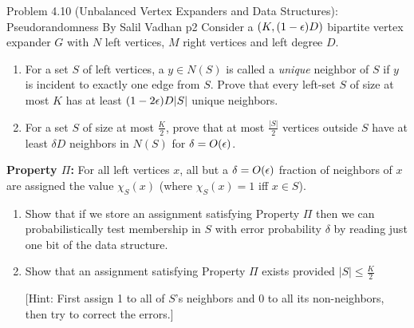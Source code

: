 \documentclass[a4paper, 11pt]{article}
\begin{document}
\begin{problem}{%
		Problem 4.10 (Unbalanced Vertex Expanders and Data Structures): Pseudorandomness By Salil Vadhan
	}{p2%
	}
	Consider a $(K,(1-\epsilon)D)$ bipartite vertex expander $G$ with $N$ left vertices, $M$ right vertices and left degree $D$.
	\begin{enumerate}
		\item For a set $S$ of left vertices, a $y\in N(S)$ is called a \textit{unique} neighbor of $S$ if $y$ is incident to exactly one edge from $S$. Prove that every left-set $S$ of size at most $K$ has at least $(1-2\epsilon)D|S|$ unique neighbors.
		\item For a set $S$ of size at most $\frac{K}2$, prove that at most $\frac{|S|}2$ vertices outside $S$ have at least $\delta D$ neighbors in $N(S)$ for $\delta=O(\epsilon)$.
		\end{enumerate}	
		
		\textbf{Property $\Pi$:} For all left vertices $x$, all but a $\delta=O(\epsilon)$ fraction of neighbors of $x$ are assigned the value $\chi_S(x)$ (where $\chi_S(x)=1$ iff $x\in S$).
		\begin{enumerate}
		\addtocounter{enumi}{2}
		\item Show that if we store an assignment satisfying Property $\Pi$ then we can probabilistically test membership in $S$ with error probability $\delta$ by reading just one bit of the data structure.
		\item Show that an assignment satisfying Property $\Pi$ exists provided $|S|\leq\frac{K}2$
		
		[Hint: First assign 1 to all of $S$'s neighbors and 0 to all its non-neighbors, then try to correct the errors.]
	\end{enumerate}
\end{problem}
\end{document}
